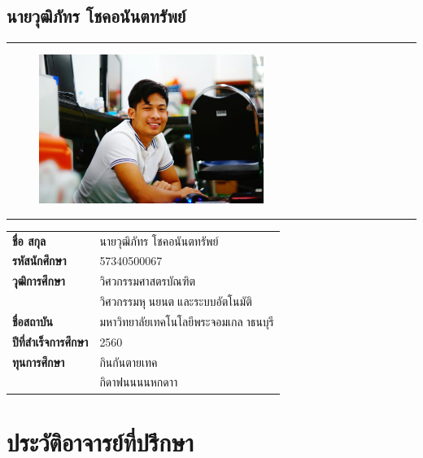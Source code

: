 \section*{นายวุฒิภัทร โชคอนันตทรัพย์}
\hrule height .7pt
\begin{figure}[!ht]
	\centering
	\includegraphics[width=0.65\textwidth]{pages/images/wuttipat.jpg}
\end{figure}
\hrule height .7pt
\raggedright
\begin{tabular}{p{} p{}}
    \textbf{ชื่อ สกุล} & {นายวุฒิภัทร โชคอนันตทรัพย์} \\
    \textbf{รหัสนักศึกษา} & {57340500067}\\
    \textbf{วุฒิการศึกษา} & {วิศวกรรมศาสตรบัณฑิต} \\
    {} & {วิศวกรรมหุนยนตและระบบอัตโนมัติ}\\
    \textbf{ชื่อสถาบัน} & {มหาวิทยาลัยเทคโนโลยีพระจอมเกลาธนบุรี} \\
    \textbf{ปีที่สำเร็จการศึกษา} & {2560} \\
    \textbf{ทุนการศึกษา} & {กินกันตายเทค}\\
    {} & {กิดาฟนนนนหกดาา}\\
\end{tabular}   

\chapter*{ประวัติอาจารย์ที่ปรึกษา}
